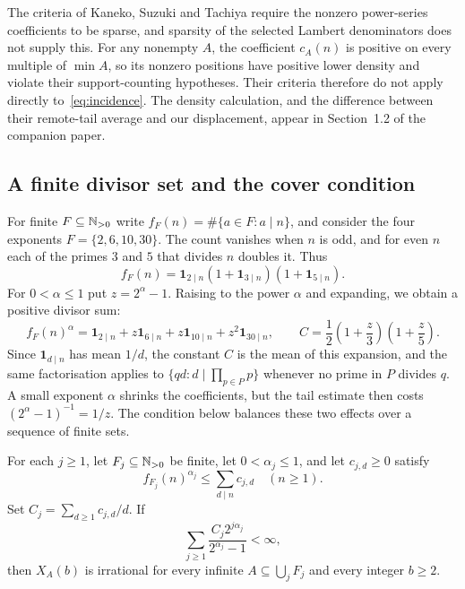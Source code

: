 \documentclass[11pt]{article}
\begin{document}
The criteria of Kaneko, Suzuki and Tachiya
\cite[Theorems~1 and~3]{kanekosuzukitachiya} require the nonzero
power-series coefficients to be sparse, and sparsity of the selected
Lambert denominators does not supply this. For any nonempty $A$, the
coefficient $c_A(n)$ is positive on every multiple of $\min A$, so its
nonzero positions have positive lower density and violate their
support-counting hypotheses. Their criteria therefore do not apply
directly to~\eqref{eq:incidence}. The density calculation, and the
difference between their remote-tail average and our displacement,
appear in
{Section~1.2 of the companion paper}.


\subsection{A finite divisor set and the cover condition}
For finite $F\subseteq\mathbb{N}_{>0}$ write $f_F(n)=\#\{a\in F:a\mid n\}$, and
consider the four exponents $F=\{2,6,10,30\}$. The count vanishes when
$n$ is odd, and for even $n$ each of the primes $3$ and $5$ that
divides $n$ doubles it. Thus
\[
 f_F(n)=\mathbf1_{2\mid n}(1+\mathbf1_{3\mid n})(1+\mathbf1_{5\mid n}).
\]
For $0<\alpha\le1$ put $z=2^\alpha-1$. Raising to the power $\alpha$
and expanding, we obtain a positive divisor sum:
\[
 f_F(n)^\alpha
 =\mathbf1_{2\mid n}+z\mathbf1_{6\mid n}
  +z\mathbf1_{10\mid n}+z^2\mathbf1_{30\mid n},\qquad
 C=\frac12\left(1+\frac z3\right)\left(1+\frac z5\right).
\]
Since $\mathbf1_{d\mid n}$ has mean $1/d$, the constant $C$ is the mean
of this expansion, and the same factorisation applies to
$\{qd:d\mid\prod_{p\in P}p\}$ whenever no prime in $P$ divides $q$.
A small exponent $\alpha$ shrinks the coefficients, but the tail
estimate then costs $(2^\alpha-1)^{-1}=1/z$. The condition below
balances these two effects over a sequence of finite sets.

\begin{theorem}\label{thm:variable-fractional-cover}
For each $j\ge1$, let $F_j\subseteq\mathbb{N}_{>0}$ be finite, let
$0<\alpha_j\le1$, and let $c_{j,d}\ge0$ satisfy
\[
 f_{F_j}(n)^{\alpha_j}\le\sum_{d\mid n}c_{j,d}\quad(n\ge1).
\]
Set $C_j=\sum_{d\ge1}c_{j,d}/d$.  If
\begin{equation*}
 \sum_{j\ge1}\frac{C_j2^{j\alpha_j}}{2^{\alpha_j}-1}<\infty,
 \tag{V}\label{eq:strengthened-cover}
\end{equation*}
then $X_A(b)$ is irrational for every infinite
$A\subseteq\bigcup_jF_j$ and every integer $b\ge2$.
\end{theorem}
\end{document}
